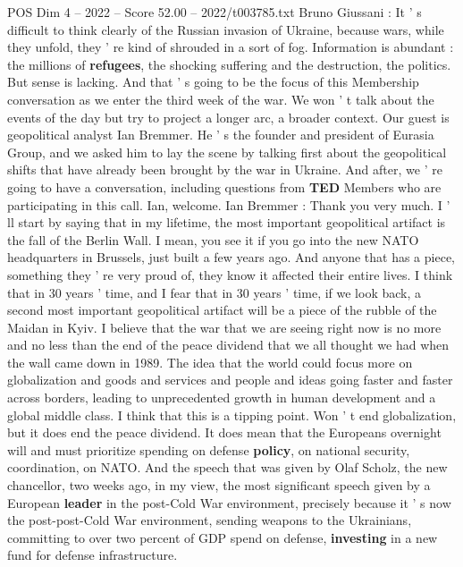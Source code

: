\begin{textsample}{POS Dim 4 – 2022 – Score 52.00 – 2022/t003785.txt}  \label{ex:f4_pos_027}
Bruno Giussani : It ' s difficult to think clearly of the Russian invasion of Ukraine, because wars, while they unfold, they ' re kind of shrouded in a sort of fog.
Information is abundant : the millions of \textbf{refugees}, the shocking suffering and the destruction, the politics.
But sense is lacking.
And that ' s going to be the focus of this Membership conversation as we enter the third week of the war.
We won ' t talk about the events of the day but try to project a longer arc, a broader context.
Our guest is geopolitical analyst Ian Bremmer.
He ' s the founder and president of Eurasia Group, and we asked him to lay the scene by talking first about the geopolitical shifts that have already been brought by the war in Ukraine.
And after, we ' re going to have a conversation, including questions from \textbf{TED} Members who are participating in this call.
Ian, welcome.
Ian Bremmer : Thank you very much.
I ' ll start by saying that in my lifetime, the most important geopolitical artifact is the fall of the Berlin Wall.
I mean, you see it if you go into the new NATO headquarters in Brussels, just built a few years ago.
And anyone that has a piece, something they ' re very proud of, they know it affected their entire lives.
I think that in 30 years ' time, and I fear that in 30 years ' time, if we look back, a second most important geopolitical artifact will be a piece of the rubble of the Maidan in Kyiv.
I believe that the war that we are seeing right now is no more and no less than the end of the peace dividend that we all thought we had when the wall came down in 1989.
The idea that the world could focus more on globalization and goods and services and people and ideas going faster and faster across borders, leading to unprecedented growth in human development and a global middle class.
I think that this is a tipping point.
Won ' t end globalization, but it does end the peace dividend.
It does mean that the Europeans overnight will and must prioritize spending on defense \textbf{policy}, on national security, coordination, on NATO.
And the speech that was given by Olaf Scholz, the new chancellor, two weeks ago, in my view, the most significant speech given by a European \textbf{leader} in the post-Cold War environment, precisely because it ' s now the post-post-Cold War environment, sending weapons to the Ukrainians, committing to over two percent of GDP spend on defense, \textbf{investing} in a new fund for defense infrastructure.

\end{textsample}
